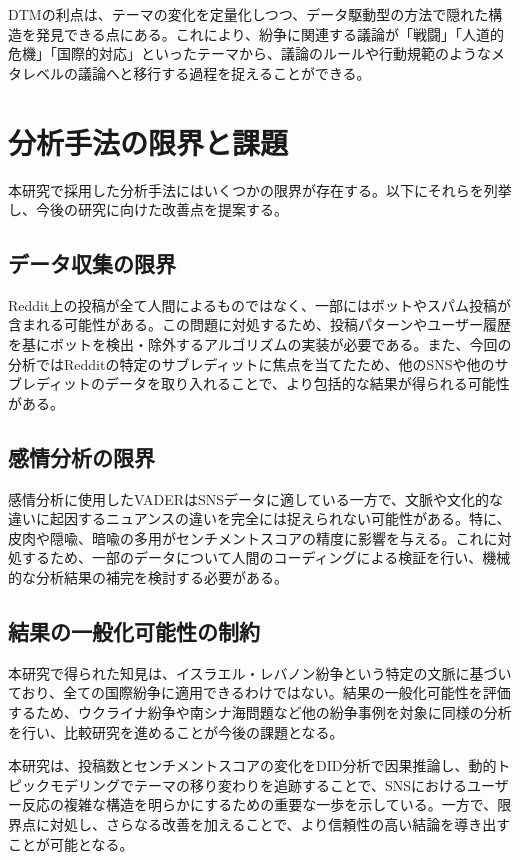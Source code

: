 \documentclass[11pt, a4j]{jreport}
\begin{document}
    DTMの利点は、テーマの変化を定量化しつつ、データ駆動型の方法で隠れた構造を発見できる点にある。これにより、紛争に関連する議論が「戦闘」「人道的危機」「国際的対応」といったテーマから、議論のルールや行動規範のようなメタレベルの議論へと移行する過程を捉えることができる。

    \section{分析手法の限界と課題}
    本研究で採用した分析手法にはいくつかの限界が存在する。以下にそれらを列挙し、今後の研究に向けた改善点を提案する。

    \subsection{データ収集の限界}
    Reddit上の投稿が全て人間によるものではなく、一部にはボットやスパム投稿が含まれる可能性がある。この問題に対処するため、投稿パターンやユーザー履歴を基にボットを検出・除外するアルゴリズムの実装が必要である。また、今回の分析ではRedditの特定のサブレディットに焦点を当てたため、他のSNSや他のサブレディットのデータを取り入れることで、より包括的な結果が得られる可能性がある。

    \subsection{感情分析の限界}
    感情分析に使用したVADERはSNSデータに適している一方で、文脈や文化的な違いに起因するニュアンスの違いを完全には捉えられない可能性がある。特に、皮肉や隠喩、暗喩の多用がセンチメントスコアの精度に影響を与える。これに対処するため、一部のデータについて人間のコーディングによる検証を行い、機械的な分析結果の補完を検討する必要がある。

    \subsection{結果の一般化可能性の制約}
    本研究で得られた知見は、イスラエル・レバノン紛争という特定の文脈に基づいており、全ての国際紛争に適用できるわけではない。結果の一般化可能性を評価するため、ウクライナ紛争や南シナ海問題など他の紛争事例を対象に同様の分析を行い、比較研究を進めることが今後の課題となる。

    本研究は、投稿数とセンチメントスコアの変化をDID分析で因果推論し、動的トピックモデリングでテーマの移り変わりを追跡することで、SNSにおけるユーザー反応の複雑な構造を明らかにするための重要な一歩を示している。一方で、限界点に対処し、さらなる改善を加えることで、より信頼性の高い結論を導き出すことが可能となる。
\end{document}
